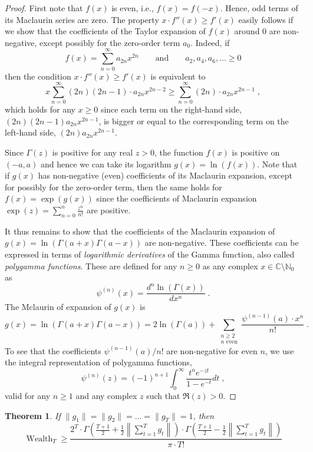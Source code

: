 \documentclass{article}
\DeclareMathOperator{\Wealth}{Wealth}
\newcommand{\N}{\mathbb{N}}  %
\newcommand{\C}{\mathbb{C}}  %
\newtheorem{theorem}{Theorem}
\begin{document}
\begin{proof}
First note that $f(x)$ is even, i.e., $f(x) = f(-x)$. Hence, odd terms of its Maclaurin series are zero.
The property $x \cdot f''(x) \ge f'(x)$ easily follows if we show that
the coefficients of the Taylor expansion of $f(x)$ around $0$ are non-negative,
except possibly for the zero-order term $a_0$. Indeed, if
$$
f(x) = \sum_{n=0}^\infty a_{2n} x^{2n} \qquad \text{and} \qquad a_2, a_4, a_6, \dots \ge 0
$$
then the condition $x \cdot f''(x) \ge f'(x)$ is equivalent to
$$
x \sum_{n=0}^\infty (2n)(2n-1) \cdot a_{2n} x^{2n-2} \ge \sum_{n=0}^\infty (2n) \cdot a_{2n} x^{2n-1} \; ,
$$
which holds for any $x \ge 0$ since each term on the right-hand side, $(2n)(2n-1) a_{2n} x^{2n-1}$, is bigger
or equal to the corresponding term on the left-hand side, $(2n) a_{2n} x^{2n-1}$.

Since $\Gamma(z)$ is positive for any real $z > 0$, the function $f(x)$ is
positive on $(-a,a)$ and hence we can take its logarithm $g(x) = \ln(f(x))$.
Note that if $g(x)$ has non-negative (even) coefficients of its Maclaurin
expansion, except for possibly for the zero-order term, then the same holds for
$f(x) = \exp(g(x))$ since the coefficients of Maclaurin expansion $\exp(z) =
\sum_{n=0}^n \frac{z^n}{n!}$ are positive.

It thus remains to show that the coefficients of the Maclaurin expansion of
$g(x) = \ln(\Gamma(a+x) \Gamma(a-x))$ are non-negative. These coefficients can
be expressed in terms of \emph{logarithmic derivatives} of the Gamma function,
also called \emph{polygamma functions}. These are defined for any $n \ge 0$ as
any complex $x \in \C \setminus \N_{0}$ as
$$
\psi^{(n)}(x) = \frac{d^n\ln(\Gamma(x))}{dx^n} \; .
$$
The Mclaurin of expansion of $g(x)$ is
$$
g(x)
= \ln \left( \Gamma(a+x) \Gamma(a-x) \right)
= 2 \ln(\Gamma(a)) + \sum_{\substack{n \ge 2 \\ \text{$n$ even}}} \frac{\psi^{(n-1)}(a) \cdot x^n}{n!} \; .
$$
To see that the coefficients $\psi^{(n-1)}(a)/n!$ are non-negative for even $n$,
we use the integral representation of polygamma functions,
$$
\psi^{(n)}(z) = (-1)^{n+1} \int_0^\infty \frac{t^n e^{-zt}}{1-e^{-t}} dt \; ,
$$
valid for any $n \ge 1$ and any complex $z$ such that $\Re(z) > 0$.
\end{proof}

\begin{theorem}
If $\|g_1\| = \|g_2\|= \dots = \|g_T\| = 1$, then
$$
\Wealth_T
\ge
\frac{2^T \cdot \Gamma \left(\frac{T+1}{2} + \frac{1}{2}\left\|\sum_{t=1}^T g_t \right\| \right) \cdot \Gamma \left(\frac{T+1}{2} - \frac{1}{2} \left\|\sum_{t=1}^T g_t \right\| \right)}{\pi \cdot T!}
$$
\end{theorem}
\end{document}
